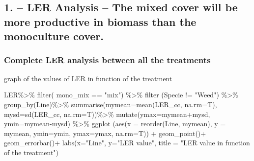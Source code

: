 \documentclass[
]{article}
\newenvironment{Shaded}{\begin{snugshade}}{\end{snugshade}}
\newcommand{\AttributeTok}[1]{\textcolor[rgb]{0.77,0.63,0.00}{#1}}
\newcommand{\FunctionTok}[1]{\textcolor[rgb]{0.00,0.00,0.00}{#1}}
\newcommand{\NormalTok}[1]{#1}
\newcommand{\SpecialCharTok}[1]{\textcolor[rgb]{0.00,0.00,0.00}{#1}}
\newcommand{\StringTok}[1]{\textcolor[rgb]{0.31,0.60,0.02}{#1}}
\begin{document}
\hypertarget{ler-analysis-the-mixed-cover-will-be-more-productive-in-biomass-than-the-monoculture-cover.}{%
\subsection{1. -- LER Analysis -- The mixed cover will be more
productive in biomass than the monoculture
cover.}\label{ler-analysis-the-mixed-cover-will-be-more-productive-in-biomass-than-the-monoculture-cover.}}

\hypertarget{complete-ler-analysis-between-all-the-treatments}{%
\subsubsection{Complete LER analysis between all the
treatments}\label{complete-ler-analysis-between-all-the-treatments}}

graph of the values of LER in function of the treatment

\begin{Shaded}
\begin{Highlighting}[]
\NormalTok{LER}\SpecialCharTok{\%\textgreater{}\%}
  \FunctionTok{filter}\NormalTok{( mono\_mix }\SpecialCharTok{==} \StringTok{"mix"}\NormalTok{) }\SpecialCharTok{\%\textgreater{}\%}
  \FunctionTok{filter}\NormalTok{ (Specie }\SpecialCharTok{!=} \StringTok{"Weed"}\NormalTok{) }\SpecialCharTok{\%\textgreater{}\%}
  \FunctionTok{group\_by}\NormalTok{(Line)}\SpecialCharTok{\%\textgreater{}\%}
  \FunctionTok{summarise}\NormalTok{(}\AttributeTok{mymean=}\FunctionTok{mean}\NormalTok{(LER\_cc, }\AttributeTok{na.rm=}\NormalTok{T),}
            \AttributeTok{mysd=}\FunctionTok{sd}\NormalTok{(LER\_cc, }\AttributeTok{na.rm=}\NormalTok{T))}\SpecialCharTok{\%\textgreater{}\%}
  \FunctionTok{mutate}\NormalTok{(}\AttributeTok{ymax=}\NormalTok{mymean}\SpecialCharTok{+}\NormalTok{mysd, }\AttributeTok{ymin=}\NormalTok{mymean}\SpecialCharTok{{-}}\NormalTok{mysd) }\SpecialCharTok{\%\textgreater{}\%}
  \FunctionTok{ggplot}\NormalTok{ (}\FunctionTok{aes}\NormalTok{(}\AttributeTok{x =} \FunctionTok{reorder}\NormalTok{(Line, mymean), }\AttributeTok{y =}\NormalTok{ mymean,}
              \AttributeTok{ymin=}\NormalTok{ymin, }\AttributeTok{ymax=}\NormalTok{ymax, }\AttributeTok{na.rm=}\NormalTok{T)) }\SpecialCharTok{+} 
  \FunctionTok{geom\_point}\NormalTok{()}\SpecialCharTok{+}
  \FunctionTok{geom\_errorbar}\NormalTok{()}\SpecialCharTok{+}
  \FunctionTok{labs}\NormalTok{(}\AttributeTok{x=}\StringTok{"Line"}\NormalTok{, }\AttributeTok{y=}\StringTok{"LER value"}\NormalTok{, }\AttributeTok{title =} \StringTok{"LER value in function of the treatment"}\NormalTok{)}
\end{Highlighting}
\end{Shaded}
\end{document}
